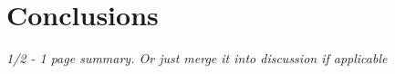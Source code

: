\chapter{Conclusions}\label{cha:conclusions}

\textit{1/2 - 1 page summary. Or just merge it into discussion if applicable}
